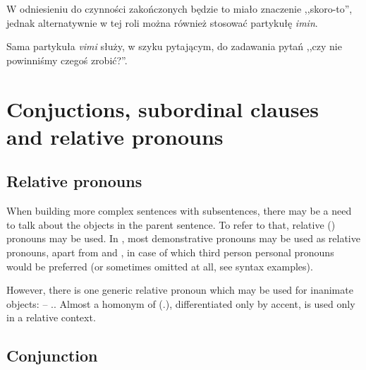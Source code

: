 
W odniesieniu do czynności zakończonych będzie to miało znaczenie ,,skoro-to'',
jednak alternatywnie w tej roli można również stosować partykułę \emph{imin}.



Sama partykuła \emph{vimi} służy, w szyku pytającym, do zadawania pytań ,,czy
nie powinniśmy czegoś zrobić?''.


\section{Conjuctions, subordinal clauses and relative pronouns}
\label{sec:conjunctions}

\subsection{Relative pronouns}
When building more complex sentences with subsentences, there may be a need to
talk about the objects in the parent sentence. To refer to that, relative
(\Rel{}) pronouns may be used. In \andro, most demonstrative pronouns may be
used as relative pronouns, apart from  and , in case of
which third person personal pronouns would be preferred (or sometimes omitted at
all, see syntax examples).

However, there is one generic relative pronoun which may be used for inanimate
objects:  -- \Rel{}.\Inan{}. Almost a homonym of 
(\Tpl{}.\Inan{}), differentiated only by accent,  is used only in a
relative context.

\subsection{Conjunction }

